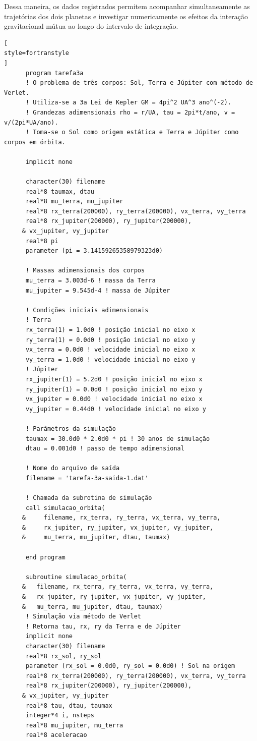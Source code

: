 \documentclass[12pt,a4paper]{article}
\begin{document}
Dessa maneira, os dados registrados permitem acompanhar simultaneamente as trajetórias dos dois planetas e investigar numericamente os efeitos da interação gravitacional mútua ao longo do intervalo de integração.

\begin{lstlisting}[
style=fortranstyle
]
      program tarefa3a
      ! O problema de três corpos: Sol, Terra e Júpiter com método de Verlet.
      ! Utiliza-se a 3a Lei de Kepler GM = 4pi^2 UA^3 ano^(-2).
      ! Grandezas adimensionais rho = r/UA, tau = 2pi*t/ano, v = v/(2pi*UA/ano).
      ! Toma-se o Sol como origem estática e Terra e Júpiter como corpos em órbita.

      implicit none

      character(30) filename
      real*8 taumax, dtau
      real*8 mu_terra, mu_jupiter
      real*8 rx_terra(200000), ry_terra(200000), vx_terra, vy_terra
      real*8 rx_jupiter(200000), ry_jupiter(200000), 
     & vx_jupiter, vy_jupiter
      real*8 pi
      parameter (pi = 3.14159265358979323d0)

      ! Massas adimensionais dos corpos
      mu_terra = 3.003d-6 ! massa da Terra
      mu_jupiter = 9.545d-4 ! massa de Júpiter

      ! Condições iniciais adimensionais
      ! Terra
      rx_terra(1) = 1.0d0 ! posição inicial no eixo x
      ry_terra(1) = 0.0d0 ! posição inicial no eixo y
      vx_terra = 0.0d0 ! velocidade inicial no eixo x
      vy_terra = 1.0d0 ! velocidade inicial no eixo y
      ! Júpiter
      rx_jupiter(1) = 5.2d0 ! posição inicial no eixo x
      ry_jupiter(1) = 0.0d0 ! posição inicial no eixo y
      vx_jupiter = 0.0d0 ! velocidade inicial no eixo x
      vy_jupiter = 0.44d0 ! velocidade inicial no eixo y

      ! Parâmetros da simulação
      taumax = 30.0d0 * 2.0d0 * pi ! 30 anos de simulação
      dtau = 0.001d0 ! passo de tempo adimensional

      ! Nome do arquivo de saída
      filename = 'tarefa-3a-saida-1.dat'

      ! Chamada da subrotina de simulação
      call simulacao_orbita(
     &     filename, rx_terra, ry_terra, vx_terra, vy_terra,
     &     rx_jupiter, ry_jupiter, vx_jupiter, vy_jupiter,
     &     mu_terra, mu_jupiter, dtau, taumax)

      end program

      subroutine simulacao_orbita(
     &   filename, rx_terra, ry_terra, vx_terra, vy_terra,
     &   rx_jupiter, ry_jupiter, vx_jupiter, vy_jupiter,
     &   mu_terra, mu_jupiter, dtau, taumax)
      ! Simulação via método de Verlet
      ! Retorna tau, rx, ry da Terra e de Júpiter
      implicit none
      character(30) filename
      real*8 rx_sol, ry_sol
      parameter (rx_sol = 0.0d0, ry_sol = 0.0d0) ! Sol na origem
      real*8 rx_terra(200000), ry_terra(200000), vx_terra, vy_terra
      real*8 rx_jupiter(200000), ry_jupiter(200000), 
     & vx_jupiter, vy_jupiter
      real*8 tau, dtau, taumax
      integer*4 i, nsteps
      real*8 mu_jupiter, mu_terra
      real*8 aceleracao


\end{lstlisting}
\end{document}
